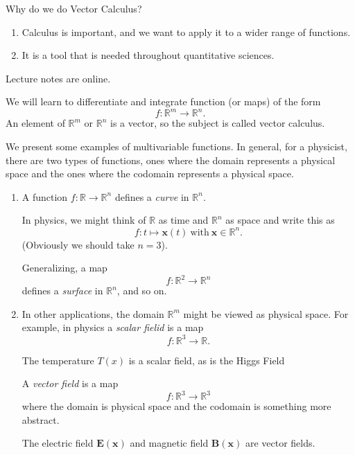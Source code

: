 \begin{problem}
Why do we do Vector Calculus?
\end{problem}
\begin{enumerate}
    \item Calculus is important, and we want to apply it to a wider range of functions.
    \item It is a tool that is needed throughout quantitative sciences.
\end{enumerate}
Lecture notes are online.

We will learn to differentiate and integrate function (or maps) of the form
\[
    f: \mathbb{R}^m \to \mathbb{R}^n.
\]
An element of \(\mathbb{R}^m\) or \(\mathbb{R}^n\) is a vector, so the subject is called vector calculus.

We present some examples of multivariable functions. In general, for a physicist, there are two types of functions, ones where the domain represents a physical space and the ones where the codomain represents a physical space.
\begin{enumerate}
    \item A function \(f: \mathbb{R} \to \mathbb{R}^n\) defines a \textit{curve} in \(\mathbb{R}^n\).

    In physics, we might think of \(\mathbb{R}\) as time and \(\mathbb{R}^n\) as space and write this as
    \[
        f: t \mapsto \mathbf{x} (t)~\text{with}~\mathbf{x} \in \mathbb{R}^n.
    \]
    (Obviously we should take \(n = 3\)).

    Generalizing, a map
    \[
        f: \mathbb{R}^2 \to \mathbb{R}^n
    \]
    defines a \textit{surface} in \(\mathbb{R}^n\), and so on.
    \item In other applications, the domain \(\mathbb{R}^m\) might be viewed as physical space. For example, in physics a \textit{scalar fielid} is a map
    \[
        f: \mathbb{R}^3 \to \mathbb{R}.
    \]
    \begin{eg}
        The temperature \(T(x)\) is a scalar field, as is the Higgs Field
    \end{eg}

    A \textit{vector field} is a map
    \[
        f: \mathbb{R}^3 \to \mathbb{R}^3
    \]
    where the domain is physical space and the codomain is something more abstract.
    \begin{eg}
        The electric field \(\mathbf{E} (\mathbf{x})\) and magnetic field \(\mathbf{B} (\mathbf{x} )\) are vector fields.
    \end{eg}
\end{enumerate}
